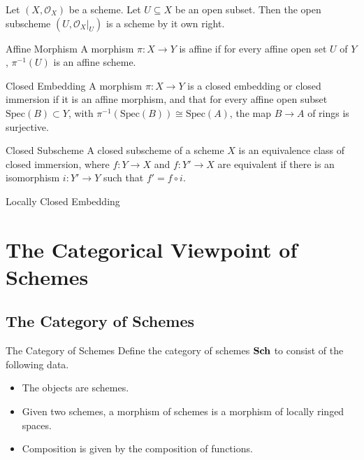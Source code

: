 \documentclass[a4paper]{article}
\begin{document}
\begin{prp}{}{} Let $(X,\mathcal{O}_X)$ be a scheme. Let $U\subseteq X$ be an open subset. Then the open subscheme $(U,\mathcal{O}_X|_U)$ is a scheme by it own right. 
\end{prp}

\begin{defn}{Affine Morphism}{} A morphism $\pi:X\to Y$ is affine if for every affine open set $U$ of $Y$, $\pi^{-1}(U)$ is an affine scheme. 
\end{defn}

\begin{defn}{Closed Embedding}{} A morphism $\pi:X\to Y$ is a closed embedding or closed immersion if it is an affine morphism, and that for every affine open subset $\text{Spec}(B)\subset Y$, with $\pi^{-1}(\text{Spec}(B))\cong\text{Spec}(A)$, the map $B\to A$ of rings is surjective. 
\end{defn}

\begin{defn}{Closed Subscheme}{} A closed subscheme of a scheme $X$ is an equivalence class of closed immersion, where $f:Y\to X$ and $f:Y'\to X$ are equivalent if there is an isomorphism $i:Y'\to Y$ such that $f'=f\circ i$. 
\end{defn}

\begin{defn}{Locally Closed Embedding}{}
\end{defn}

\pagebreak
\section{The Categorical Viewpoint of Schemes}
\subsection{The Category of Schemes}
\begin{defn}{The Category of Schemes}{} Define the category of schemes $\bold{Sch}$ to consist of the following data. 
\begin{itemize}
\item The objects are schemes. 
\item Given two schemes, a morphism of schemes is a morphism of locally ringed spaces. 
\item Composition is given by the composition of functions. 
\end{itemize}
\end{defn}
\end{document}
